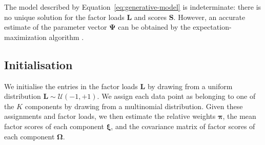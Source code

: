 \documentclass[twocolumn]{aastex61}
\newcommand{\vect}[1]{\boldsymbol{\mathbf{#1}}}
\renewcommand{\vec}[1]{\vect{#1}}
\newcommand{\weight}{\pi}
\newcommand{\data}{\textbf{Y}}
\newcommand{\vecdata}{\vec\data}
\newcommand{\factorloads}{\textbf{L}}
\newcommand{\factorscores}{\textbf{S}}
\newcommand{\scoremeans}{\vec\xi}
\newcommand{\scorecovs}{\vec\Omega}
\begin{document}
The model described by Equation~\ref{eq:generative-model} is indeterminate:
there is no unique solution for the factor loads $\factorloads$ and scores
$\factorscores$. However, an accurate estimate of the parameter vector $\vec\Psi$ can be obtained by the expectation-maximization algorithm \citep{EM}. 



\subsection{Initialisation}

We initialise the entries in the factor loads $\factorloads$ by drawing
from a uniform distribution $\factorloads \sim \mathcal{U}\left(-1, +1\right)$.
We assign each data point as belonging to one of the $K$ components
by drawing from a multinomial distribution. Given these assignments and
factor loads, we then estimate the relative weights $\vec\pi$, the 
mean factor scores of each component $\scoremeans$, and the covariance
matrix of factor scores of each component $\scorecovs$. 

\end{document}
